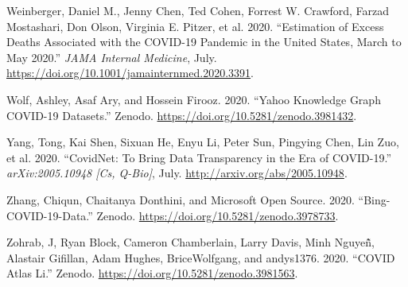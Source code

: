 \documentclass[
]{article}
\newlength{\cslhangindent}
\newenvironment{cslreferences}%
  {\setlength{\parindent}{0pt}%
  \everypar{\setlength{\hangindent}{\cslhangindent}}\ignorespaces}%
  {\par}
\begin{document}
\begin{cslreferences}
\leavevmode\hypertarget{ref-weinbergerEstimationExcessDeaths2020}{}%
Weinberger, Daniel M., Jenny Chen, Ted Cohen, Forrest W. Crawford,
Farzad Mostashari, Don Olson, Virginia E. Pitzer, et al. 2020.
``Estimation of Excess Deaths Associated with the COVID-19 Pandemic in
the United States, March to May 2020.'' \emph{JAMA Internal Medicine},
July. \url{https://doi.org/10.1001/jamainternmed.2020.3391}.

\leavevmode\hypertarget{ref-ashleywolfYahooKnowledgeGraph2020}{}%
Wolf, Ashley, Asaf Ary, and Hossein Firooz. 2020. ``Yahoo Knowledge
Graph COVID-19 Datasets.'' Zenodo.
\url{https://doi.org/10.5281/zenodo.3981432}.

\leavevmode\hypertarget{ref-yangCovidNetBringData2020}{}%
Yang, Tong, Kai Shen, Sixuan He, Enyu Li, Peter Sun, Pingying Chen, Lin
Zuo, et al. 2020. ``CovidNet: To Bring Data Transparency in the Era of
COVID-19.'' \emph{arXiv:2005.10948 {[}Cs, Q-Bio{]}}, July.
\url{http://arxiv.org/abs/2005.10948}.

\leavevmode\hypertarget{ref-chiqunzhangBingCOVID19Data2020}{}%
Zhang, Chiqun, Chaitanya Donthini, and Microsoft Open Source. 2020.
``Bing-COVID-19-Data.'' Zenodo.
\url{https://doi.org/10.5281/zenodo.3978733}.

\leavevmode\hypertarget{ref-jzohrabCOVIDAtlasLi2020}{}%
Zohrab, J, Ryan Block, Cameron Chamberlain, Larry Davis, Minh Nguyeñ̂,
Alastair Gifillan, Adam Hughes, BriceWolfgang, and andys1376. 2020.
``COVID Atlas Li.'' Zenodo.
\url{https://doi.org/10.5281/zenodo.3981563}.
\end{cslreferences}
\end{document}
